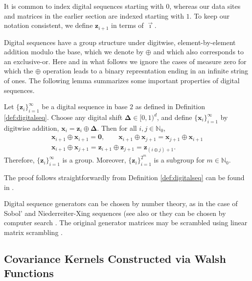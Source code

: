 \documentclass[graybox,footinfo]{svmult}
\newcommand{\bm}[1]{\boldsymbol{#1}}
\newcommand{\naturals}{\mathbb{N}}
\newcommand{\natzero}{\mathbb{N}_0}
\newcommand{\vDelta}{{\boldsymbol{\Delta}}}
\newcommand{\vx}{\bm{x}}
\newcommand{\vz}{\bm{z}}
\newcommand{\ai}{\overrightarrow{\imath}}
\begin{document}
It is common to index digital sequences starting with $0$, whereas our data sites and matrices in the earlier section are indexed starting with $1$.  To keep our notation consistent, we define $\vz_{i+1}$ in terms of $\ai$.

Digital sequences have a group structure under digitwise, element-by-element addition modulo the base, which we denote by $\oplus$ and which also corresponds to an exclusive-or. Here and in what follows we ignore the cases of measure zero for which the $\oplus$ operation leads to a binary represntation ending in an infinite string of ones.  The following lemma summarizes some important properties of digital sequences. 


\begin{lemma}
	\label{lemma:digital_net_prop}
	Let $\{\vz_i\}_{i=1}^{\infty}$ be a digital sequence in base $2$ as defined in Definition \ref{def:digitalseq}.  Choose any digital shift $\vDelta \in [0,1)^d$, and define $\{\vx_i\}_{i=1}^{\infty}$ by digitwise addition, $\vx_{i} = \vz_{i} \oplus \vDelta$.
	Then for all $i,j \in \naturals_0$,
	\begin{gather}
		\label{eqn:digital_net_symmetric_prop}
	\vx_{i+1} \oplus \vx_{i+1} = \boldsymbol{0}, \qquad 
	\vx_{i+1} \oplus \vx_{j+1} = \vx_{j+1} \oplus \vx_{i+1} \\
	\label{eqn:digital_shift_prop}
	\vx_{i+1} \oplus \vx_{j+1} = \vz_{i+1} \oplus \vz_{j+1} = \vz_{(i \oplus j) + 1 }.
	\end{gather}
	Therefore, $\{\vz_i\}_{i=1}^{\infty}$ is a group.  Moreover, $\{\vz_i\}_{i=1}^{2^m}$ is a subgroup for $m \in \natzero$.
\end{lemma}
The proof follows straightforwardly from Definition \ref{def:digitalseq} can be found in \cite{JagThesis19a}.

Digital sequence generators can be chosen by number theory, as in the case of Sobol' \cite{Sob67} and Niederreiter-Xing sequences \cite{NieXin01a} (see also \cite[Chapter 8]{DicPil10a} or they can be chosen by computer search \cite[Chapter 10]{DicPil10a}.  The original generator matrices may be scrambled using linear matrix scrambling \cite{Mat98}.


\subsection{Covariance Kernels Constructed via Walsh Functions} \label{sec:Walsh_kernels}
\end{document}
